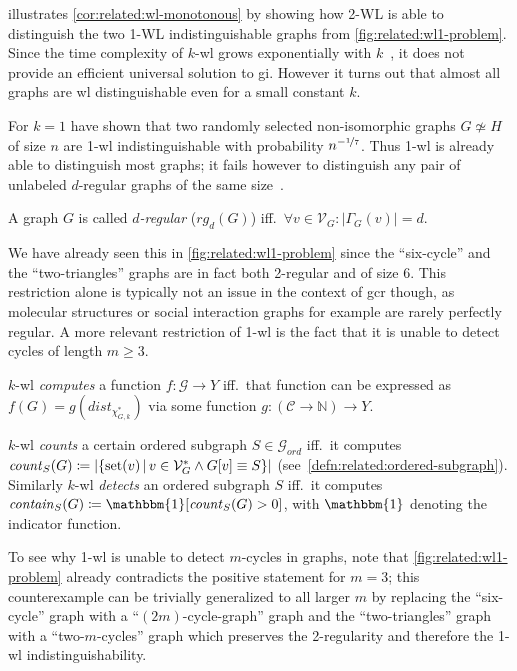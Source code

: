  illustrates \cref{cor:related:wl-monotonous} by showing how 2-WL is able to distinguish the two 1-WL indistinguishable graphs from \cref{fig:related:wl1-problem}.
Since the time complexity of $k$-\acs{wl} grows exponentially with $k$~\cite[cor.~1.9.7]{Immerman1990}, it does not provide an efficient universal solution to \ac{gi}.
However it turns out that almost all graphs are \ac{wl} distinguishable even for a small constant $k$.

For $k = 1$ \citet{Babai1980} have shown that two randomly selected non-isomorphic graphs $G \not\simeq H$ of size $n$ are 1-\acs{wl} indistinguishable with probability $n^{-\nicefrac{1}{7}}$.
Thus 1-\acs{wl} is already able to distinguish most graphs; it fails however to distinguish any pair of unlabeled $d$-regular graphs of the same size~\cite[cor.~1.8.5]{Immerman1990}.
\begin{defn}
	A graph $G$ is called \textit{$d$-regular} ($\mathit{rg}_d(G)$) iff.\ $\forall v \in \mathcal{V}_G: {|\Gamma_G(v)|} = d$.
\end{defn}
We have already seen this in \cref{fig:related:wl1-problem} since the ``six-cycle'' and the ``two-triangles'' graphs are in fact both 2-regular and of size 6.
This restriction alone is typically not an issue in the context of \ac{gcr} though, as molecular structures or social interaction graphs for example are rarely perfectly regular.
A more relevant restriction of 1-\acs{wl} is the fact that it is unable to detect cycles of length $m \geq 3$.
\begin{defn}\label{defn:related:wl-compute}
	$k$-\acs{wl} \textit{computes} a function $f: \mathcal{G} \to Y$ iff.\ that function can be expressed as $f(G) = g(\mathit{dist}_{\chi_{G, k}^{*}})$ via some function $g: (\mathcal{C} \to \mathbb{N}) \to Y$.
\end{defn}
\begin{defn}\label{defn:related:wl-count-detect}
	$k$-\acs{wl} \textit{counts} a certain ordered subgraph $S \in \mathcal{G}_{\mathit{ord}}$ iff.\ it computes $\mathit{count}_S(G) \coloneqq \left|\{ \operatorname{set}(v)\, |\, v \in \mathcal{V}_G^{*} \land G[v] \equiv S \}\right|$ (see~\cref{defn:related:ordered-subgraph}).
	Similarly $k$-\acs{wl} \textit{detects} an ordered subgraph $S$ iff.\ it computes $\mathit{contain}_S(G) \coloneqq \mathbbm{1}[\mathit{count}_S(G) > 0]$, with $\mathbbm{1}$ denoting the indicator function.
\end{defn}
To see why 1-\acs{wl} is unable to detect $m$-cycles in graphs, note that \cref{fig:related:wl1-problem} already contradicts the positive statement for $m = 3$;
this counterexample can be trivially generalized to all larger $m$ by replacing the ``six-cycle'' graph with a ``$(2m)$-cycle-graph'' graph and the ``two-triangles'' graph with a ``two-$m$-cycles'' graph which preserves the 2-regularity and therefore the 1-\acs{wl} indistinguishability.


